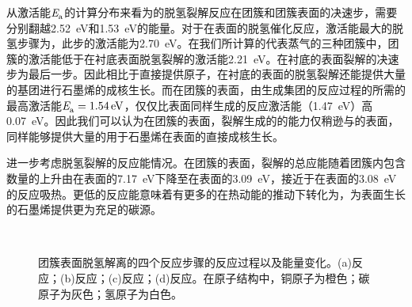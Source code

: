     从激活能$\it E_{\rm a}^{\rm } \it$的计算分布来看为的脱氢裂解反应在团簇和团簇表面的决速步，需要分别翻越\SI{2.52}{\electronvolt}和\SI{1.53}{\electronvolt}的能量。对于在表面的脱氢催化反应，激活能最大的脱氢步骤为，此步的激活能为\SI{2.70}{\electronvolt}。在我们所计算的代表蒸气的三种团簇中，团簇的激活能低于在衬底表面脱氢裂解的激活能\SI{2.21}{\electronvolt}。在衬底的表面裂解的决速步为最后一步。因此相比于直接提供原子，在衬底的表面的脱氢裂解还能提供大量的基团进行石墨烯的成核生长。而在团簇的表面，由生成集团的反应过程的所需的最高激活能$\it E_{\rm a}^{\rm } \it=\SI{1.54}{\electronvolt}$，仅仅比表面同样生成的反应激活能（\SI{1.47}{\electronvolt}）高\SI{0.07}{\electronvolt}。因此我们可以认为在团簇的表面，裂解生成的的能力仅稍逊与的表面，同样能够提供大量的用于石墨烯在表面的直接成核生长。 

    进一步考虑脱氢裂解的反应能情况。在团簇的表面，裂解的总应能随着团簇内包含数量的上升由在表面的\SI{7.17}{\electronvolt}下降至在表面的\SI{3.09}{\electronvolt}，接近于在表面的\SI{3.08}{\electronvolt}的反应吸热。更低的反应能意味着有更多的在热动能的推动下转化为，为表面生长的石墨烯提供更为充足的碳源。
    
    \begin{figure}[!htb]
        \\[-0.5ex]
        \caption{团簇表面脱氢解离的四个反应步骤的反应过程以及能量变化。(a)反应；(b)反应；(c)反应；(d)反应。在原子结构中，铜原子为橙色；碳原子为灰色；氢原子为白色。}
        \label{fig:CG_DFT_Cu3-CH4-C}
    \end{figure}

